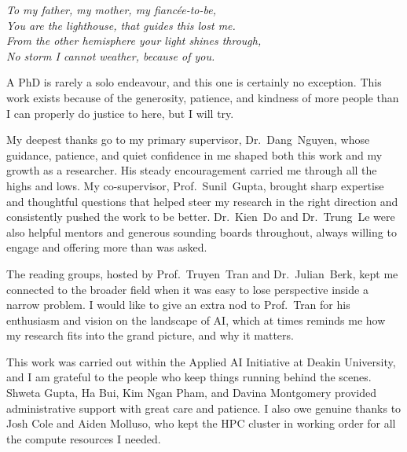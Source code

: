 
\frontmattersection{ }
{
  \centering
  \textit{
    To my father, my mother, my fiancée-to-be, \\
    You are the lighthouse, that guides this lost me. \\
    From the other hemisphere your light shines through, \\
    No storm I cannot weather, because of you.
  }
  \par
}


\begin{foldable}
  A PhD is rarely a solo endeavour, and this one is certainly no exception.
  This work exists because of the generosity, patience, and kindness of more people than I can properly do justice to here, but I will try.
\end{foldable}

\begin{foldable}
  My deepest thanks go to my primary supervisor, Dr.\ Dang~Nguyen, whose guidance, patience, and quiet confidence in me shaped both this work and my growth as a researcher.
  His steady encouragement carried me through all the highs and lows.
  My co-supervisor, Prof.\ Sunil~Gupta, brought sharp expertise and thoughtful questions that helped steer my research in the right direction and consistently pushed the work to be better.
  Dr.\ Kien~Do and Dr.\ Trung~Le were also helpful mentors and generous sounding boards throughout, always willing to engage and offering more than was asked.
\end{foldable}

\begin{foldable}
  The reading groups, hosted by Prof.\ Truyen~Tran and Dr.\ Julian~Berk, kept me connected to the broader field when it was easy to lose perspective inside a narrow problem.
  I would like to give an extra nod to Prof.\ Tran for his enthusiasm and vision on the landscape of AI, which at times reminds me how my research fits into the grand picture, and why it matters.
\end{foldable}

\begin{foldable}
  This work was carried out within the Applied AI Initiative at Deakin University, and I am grateful to the people who keep things running behind the scenes.
  Shweta Gupta, Ha Bui, Kim Ngan Pham, and Davina Montgomery provided administrative support with great care and patience.
  I also owe genuine thanks to Josh Cole and Aiden Molluso, who kept the HPC cluster in working order for all the compute resources I needed.
\end{foldable}

